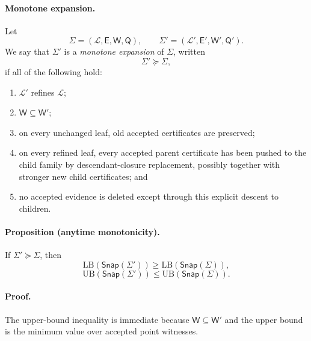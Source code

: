 \paragraph{Monotone expansion.}
Let
\[
\Sigma=(\mathcal L,\mathsf E,\mathsf W,\mathsf Q),
\qquad
\Sigma'=(\mathcal L',\mathsf E',\mathsf W',\mathsf Q').
\]
We say that $\Sigma'$ is a \emph{monotone expansion} of $\Sigma$, written
\[
\Sigma'\succeq \Sigma,
\]
if all of the following hold:
\begin{enumerate}
    \item $\mathcal L'$ refines $\mathcal L$;
    \item $\mathsf W\subseteq \mathsf W'$;
    \item on every unchanged leaf, old accepted certificates are preserved;
    \item on every refined leaf, every accepted parent certificate has been pushed to the child family by descendant-closure replacement, possibly together with stronger new child certificates; and
    \item no accepted evidence is deleted except through this explicit descent to children.
\end{enumerate}

\paragraph{\normalfont Proposition (anytime monotonicity).}
If $\Sigma'\succeq \Sigma$, then
\begin{equation}
\mathrm{LB}(\mathsf{Snap}(\Sigma'))
\ge
\mathrm{LB}(\mathsf{Snap}(\Sigma)),
\label{eq:appAnew-anytime-LB}
\end{equation}
\begin{equation}
\mathrm{UB}(\mathsf{Snap}(\Sigma'))
\le
\mathrm{UB}(\mathsf{Snap}(\Sigma)).
\label{eq:appAnew-anytime-UB}
\end{equation}

\paragraph{\normalfont Proof.}
The upper-bound inequality is immediate because $\mathsf W\subseteq \mathsf W'$ and the upper bound is the minimum value over accepted point witnesses.

